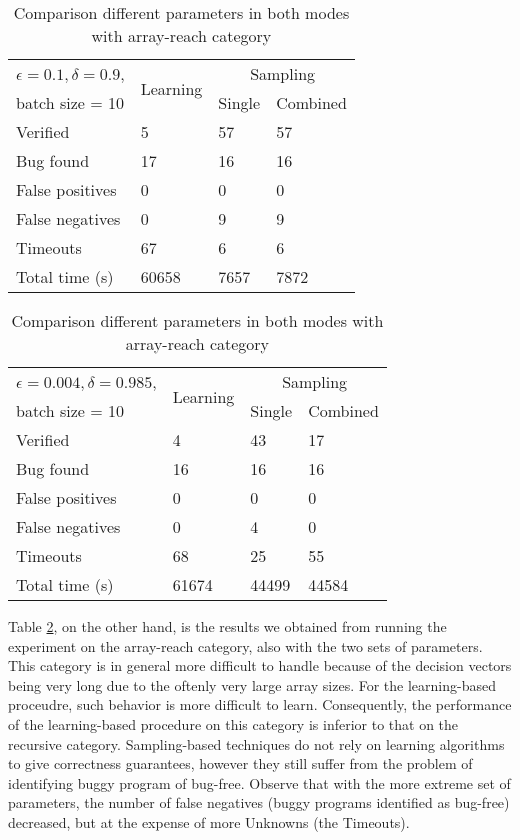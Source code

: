 \begin{table}[h]
	\centering
	\caption{Comparison different parameters in both modes with array-reach category}
	\label{table:compare_param_array}
	\begin{tabular}{|l|l|l|l|}
		\hline
		$\epsilon = 0.1, \delta = 0.9$, & \multirow{2}{*}{Learning} & \multicolumn{2}{c|}{Sampling} \\
		\cline{3-4}
		batch size = 10 & & Single & Combined \\
		\hline
		Verified & 5 & 57 & 57 \\
		Bug found & 17 & 16 & 16 \\
		\hline
		False positives & 0 & 0 & 0 \\
		False negatives & 0 & 9 & 9 \\
		Timeouts & 67 & 6 & 6 \\
		\hline
		Total time (s) & 60658 & 7657 & 7872 \\
		\hline
	\end{tabular}
	
	\bigskip
	
	\begin{tabular}{|l|l|l|l|}
		\hline
		$\epsilon = 0.004, \delta = 0.985$, & \multirow{2}{*}{Learning} & \multicolumn{2}{c|}{Sampling} \\
		\cline{3-4}
		batch size = 10 & & Single & Combined \\
		\hline
		Verified & 4 & 43 & 17 \\
		Bug found & 16 & 16 & 16 \\
		\hline
		False positives & 0 & 0 & 0 \\
		False negatives & 0 & 4 & 0 \\
		Timeouts & 68 & 25 & 55 \\
		\hline
		Total time (s) & 61674 & 44499 & 44584 \\
		\hline
	\end{tabular}
\end{table}

Table \ref{table:compare_param_array}, on the other hand, is the results we obtained from running the experiment on the array-reach category, also with the two sets of parameters. This category is in general more difficult to handle because of the decision vectors being very long due to the oftenly very large array sizes. For the learning-based proceudre, such behavior is more difficult to learn. Consequently, the performance of the learning-based procedure on this category is inferior to that on the recursive category. Sampling-based techniques do not rely on learning algorithms to give correctness guarantees, however they still suffer from the problem of identifying buggy program of bug-free. Observe that with the more extreme set of parameters, the number of false negatives (buggy programs identified as bug-free) decreased, but at the expense of more Unknowns (the Timeouts). 

